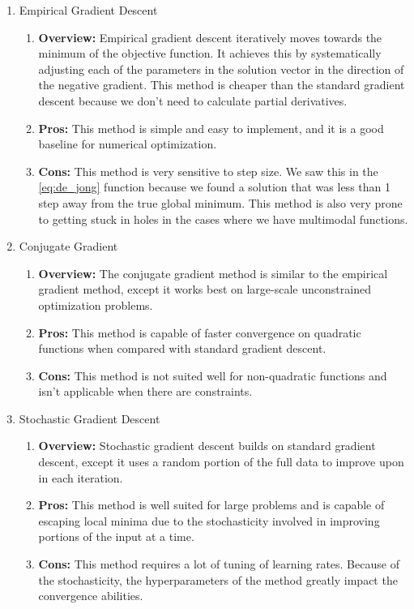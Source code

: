 \documentclass{article}
\begin{document}
\begin{enumerate}
\item Empirical Gradient Descent
    \begin{enumerate}
        \item \textbf{Overview:} Empirical gradient descent iteratively moves towards the minimum of the objective function. It achieves this by systematically adjusting each of the parameters in the solution vector in the direction of the negative gradient. This method is cheaper than the standard gradient descent because we don't need to calculate partial derivatives.
        \item \textbf{Pros:} This method is simple and easy to implement, and it is a good baseline for numerical optimization.
        \item \textbf{Cons:} This method is very sensitive to step size. We saw this in the \ref{eq:de_jong} function because we found a solution that was less than 1 step away from the true global minimum. This method is also very prone to getting stuck in holes in the cases where we have multimodal functions. 
    \end{enumerate}
\item Conjugate Gradient
    \begin{enumerate}
        \item \textbf{Overview:} The conjugate gradient method is similar to the empirical gradient method, except it works best on large-scale unconstrained optimization problems.
        \item \textbf{Pros:} This method is capable of faster convergence on quadratic functions when compared with standard gradient descent.
        \item \textbf{Cons:} This method is not suited well for non-quadratic functions and isn't applicable when there are constraints. 
    \end{enumerate}
\item Stochastic Gradient Descent
    \begin{enumerate}
        \item \textbf{Overview:} Stochastic gradient descent builds on standard gradient descent, except it uses a random portion of the full data to improve upon in each iteration.
        \item \textbf{Pros:} This method is well suited for large problems and is capable of escaping local minima due to the stochasticity involved in improving portions of the input at a time.
        \item \textbf{Cons:} This method requires a lot of tuning of learning rates. Because of the stochasticity, the hyperparameters of the method greatly impact the convergence abilities.

\end{enumerate}
\end{enumerate}
\end{document}
